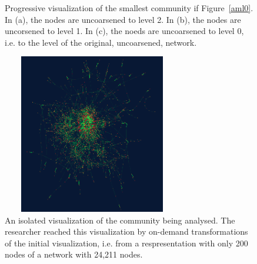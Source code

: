 \documentclass[runningheads]{llncs}
\begin{document}
\begin{figure}[!h]\centering
    \caption{Progressive visualization of the smallest community if Figure~\ref{aml0}. In (a), the nodes are uncoarsened to level 2.
    In (b), the nodes are uncorsened to level 1.
    In (c), the noeds are uncoarsened to level 0, i.e. to the level of the original, uncoarsened, network.}%
    \label{aml1}%
\end{figure}

\begin{figure}\centering
 \includegraphics[width=0.7\textwidth,height=7cm]{aml5_}
  \caption{An isolated visualization of the community being analysed.
  The researcher reached this visualization by on-demand transformations of the initial visualization, i.e. from a respresentation with only 200 nodes of a network with 24,211 nodes.}\label{amlf}
\end{figure}
\end{document}

